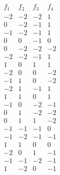 $$\begin{array}{rrrr} 
f_1 & f_2 & f_3 & f_4 \\ 
\hline 
-2 & -2 & -2 &  1 \\ 
 0 & -2 & -1 &  1 \\ 
-1 & -2 & -1 &  1 \\ 
 0 &  0 & -1 &  0 \\ 
 0 & -2 & -2 & -2 \\ 
-2 & -2 & -1 &  1 \\ 
 1 &  0 &  1 &  1 \\ 
-2 &  0 &  0 & -2 \\ 
-1 &  1 &  0 & -2 \\ 
-2 &  1 & -1 &  1 \\ 
 1 &  1 &  0 &  1 \\ 
-1 &  0 & -2 & -1 \\ 
 0 &  1 & -2 & -2 \\ 
 0 &  1 &  1 & -2 \\ 
-1 & -1 & -1 &  0 \\ 
-1 & -2 & -1 & -1 \\ 
 1 &  1 &  0 &  0 \\ 
-2 &  0 &  1 & -1 \\ 
-1 & -1 & -2 & -1 \\ 
 1 & -2 &  0 & -1 \\ 
\end{array}$$ 
